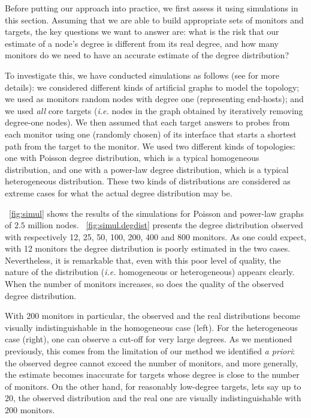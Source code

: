 \documentclass[conference]{IEEEtran}
\begin{document}
Before putting our approach into practice, we first assess it using simulations in this section. Assuming that we are able to build appropriate sets of monitors and targets, the key questions we want to answer are: what is the risk that our estimate of a node's degree is different from its real degree, and how many monitors do we need to have an accurate estimate of the degree distribution?

To investigate this, we have conducted simulations as follows (see \cite{CT01} for more details): we considered different kinds of artificial graphs to model the topology; we used as monitors random nodes with degree one (representing end-hosts); and we used {\em all} core targets ({\em i.e.} nodes in the graph obtained by iteratively removing degree-one nodes). We then assumed that each target answers to probes from each monitor using one (randomly chosen) of its interface that starts a shortest path from the target to the monitor. We used two different kinds of topologies: one with Poisson degree distribution, which is a typical homogeneous distribution, and one with a power-law degree distribution, which is a typical heterogeneous distribution. These two kinds of distributions are considered as extreme cases for what the actual degree distribution may be.

\figurename~\ref{fig:simul} shows the results of the simulations for Poisson and power-law graphs of $2.5$ million nodes.  \figurename~\ref{fig:simul.degdist} presents the degree distribution observed with respectively 12, 25, 50, 100, 200, 400 and 800 monitors. As one could expect, with 12 monitors the degree distribution is poorly estimated in the two cases. Nevertheless, it is remarkable that, even with this poor level of quality, the nature of the distribution (\emph{i.e.} homogeneous or heterogeneous) appears clearly.  When the number of monitors increases, so does the quality of the observed degree distribution.

With $200$ monitors in particular, the observed and the real distributions become visually indistinguishable in the homogeneous case (left). For the heterogeneous case (right), one can observe a cut-off for very large degrees. As we mentioned previously, this comes from the limitation of our method we identified {\em a priori}: the observed degree cannot exceed the number of monitors, and more generally, the estimate becomes inaccurate for targets whose degree is close to the number of monitors. On the other hand, for reasonably low-degree targets, lets say up to 20, the observed distribution and the real one are visually indistinguishable with $200$ monitors.
\end{document}
